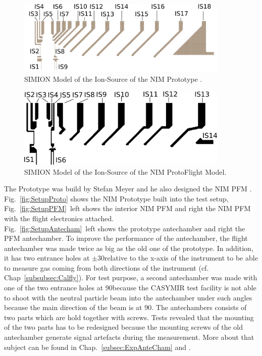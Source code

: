 	\begin{figure}[h] %
		\centering
		\includegraphics[width= 0.9\textwidth]{Setup/Proto_IS_sim.png}
		\caption{SIMION Model of the Ion-Source of the NIM Prototype \cite{Diss_Meyer}.}
		\label{fig:SetupProtoISSim}
	\end{figure}
	\begin{figure}[h] %
		\centering
		\includegraphics[width=0.9\textwidth]{Setup/ISFlight_bearb.png}
		\caption{SIMION Model of the Ion-Source of the NIM ProtoFlight Model.}
		\label{fig:SetupPFMISSim}
	\end{figure}
	The Prototype was build by Stefan Meyer and he also designed the NIM PFM \cite{Diss_Meyer}. Fig.~\ref{fig:SetupProto} shows the NIM Prototype built into the test setup, Fig.~\ref{fig:SetupPFM}~left shows the interior NIM PFM and right the NIM PFM with the flight electronics attached.\\ %
	Fig.~\ref{fig:SetupAntecham}~left shows the prototype antechamber and right the PFM antechamber. To improve the performance of the antechamber, the flight antechamber was made twice as big as the old one of the prototype. In addition, it has two entrance holes at $\pm$30\degree relative to the x-axis of the instrument to be able to measure gas coming from both directions of the instrument (cf. Chap~\ref{subsubsec:Calfly}). %
	For test purpose, a second antechamber was made with one of the two entrance holes at 90\degree because the CASYMIR test facility \cite{CASYMIR_Graf2004} is not able to shoot with the neutral particle beam into the antechamber under such angles because the main direction of the beam is at 90\degree. The antechambers consists of two parts which are hold together with screws. Tests revealed that the mounting of the two parts has to be redesigned because the mounting screws of the old antechamber generate signal artefacts during the measurement. More about that subject can be found in Chap.~\ref{subsec:ExpAnteCham} and \cite{Meyer_2017_ante}.\\
